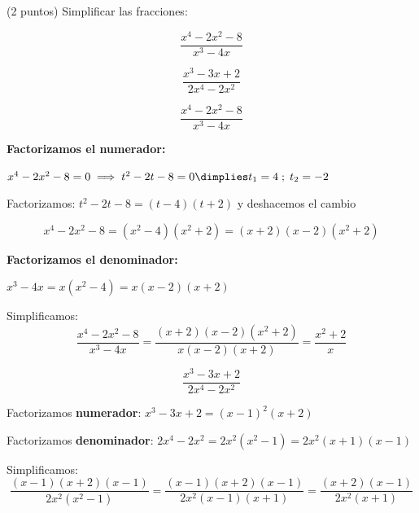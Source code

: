 \documentclass[palatino,nosec]{Docencia}
\begin{document}
\begin{problem} (2 puntos)
Simplificar las fracciones:

\ppart
\[
	\frac{x^4-2x^2-8}{x^3-4x} 
\]

\ppart

\[
	\frac{x^3-3x+2}{2x^4-2x^2}
\]

\solution

\spart 
\[\frac{x^4-2x^2-8}{x^3-4x}\]

\textbf{Factorizamos el numerador:}

$x^4-2x^2-8 = 0 \implies t^2-2t-8 = 0 \dimplies t_1=4\;;\;t_2=-2 $ 

Factorizamos: $t^2-2t-8 = (t-4)(t+2)$ y deshacemos el cambio

\[
	x^4-2x^2-8 = (x^2-4)(x^2+2) = (x+2)(x-2)(x^2+2)	
\]

\textbf{Factorizamos el denominador:}

$x^3-4x = x(x^2-4) = x(x-2)(x+2)$

Simplificamos:
\[
\frac{x^4-2x^2-8}{x^3-4x} = \frac{(x+2)(x-2)(x^2+2)	}{x(x-2)(x+2)} = \frac{x^2+2}{x}
\]

\spart 

\[
\frac{x^3-3x+2}{2x^4-2x^2}\]

Factorizamos \textbf{numerador}: $x^3-3x+2 = (x-1)^2(x+2)$

Factorizamos \textbf{denominador}: $2x^4-2x^2 = 2x^2(x^2-1) = 2x^2(x+1)(x-1)$

Simplificamos:
\[\frac{(x-1)(x+2)(x-1)}{2x^2(x^2-1)} = \frac{(x-1)(x+2)(x-1)}{2x^2(x-1)(x+1)} = \frac{(x+2)(x-1)}{2x^2(x+1)}
\]

\end{problem}
\end{document}
